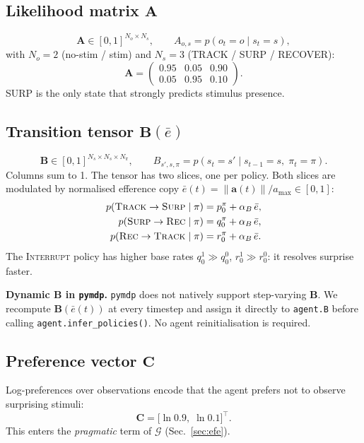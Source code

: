 \documentclass[11pt, a4paper]{article}
\newcommand{\vect}[1]{\bm{#1}}
\newcommand{\mat}[1]{\mathbf{#1}}
\newcommand{\EFE}{\mathcal{G}}
\newcommand{\norm}[1]{\left\|#1\right\|}
\begin{document}
\subsection{Likelihood matrix $\mat{A}$}
\begin{equation}
  \mat{A} \in [0,1]^{N_o \times N_s},
  \qquad
  A_{o,s} = p(o_t = o \mid s_t = s),
\end{equation}
with $N_o = 2$ (no-stim / stim) and $N_s = 3$ (TRACK / SURP / RECOVER):
\begin{equation}
  \mat{A} =
  \begin{pmatrix}
    0.95 & 0.05 & 0.90 \\
    0.05 & 0.95 & 0.10
  \end{pmatrix}.
\end{equation}
SURP is the only state that strongly predicts stimulus presence.

\subsection{Transition tensor $\mat{B}(\bar{e})$}
\begin{equation}
  \mat{B} \in [0,1]^{N_s \times N_s \times N_\pi},
  \qquad
  B_{s',s,\pi} = p(s_t = s' \mid s_{t-1} = s,\; \pi_t = \pi).
\end{equation}
Columns sum to 1. The tensor has two slices, one per policy.
Both slices are modulated by normalised efference copy
$\bar{e}(t) = \norm{\vect{a}(t)}/a_{\max} \in [0,1]$:
\begin{align}
  p(\textsc{Track} \to \textsc{Surp} \mid \pi)
    &= p_0^\pi + \alpha_B\,\bar{e}, \\
  p(\textsc{Surp}  \to \textsc{Rec}  \mid \pi)
    &= q_0^\pi + \alpha_B\,\bar{e}, \\
  p(\textsc{Rec}   \to \textsc{Track}\mid \pi)
    &= r_0^\pi + \alpha_B\,\bar{e}.
\end{align}
The \textsc{Interrupt} policy has higher base rates $q_0^1 \gg q_0^0$,
$r_0^1 \gg r_0^0$: it resolves surprise faster.

\begin{notebox}
\textbf{Dynamic B in \texttt{pymdp}.}
\texttt{pymdp} does not natively support step-varying $\mat{B}$.
We recompute $\mat{B}(\bar{e}(t))$ at every timestep and assign it
directly to \texttt{agent.B} before calling
\texttt{agent.infer\_policies()}. No agent reinitialisation is required.
\end{notebox}

\subsection{Preference vector $\mat{C}$}
Log-preferences over observations encode that the agent prefers not to
observe surprising stimuli:
\begin{equation}
  \mat{C} = \bigl[\ln 0.9,\; \ln 0.1\bigr]^\top.
\end{equation}
This enters the \emph{pragmatic} term of $\EFE$ (Sec.~\ref{sec:efe}).
\end{document}

